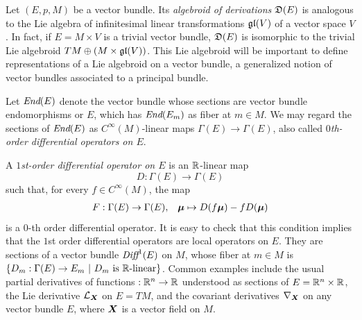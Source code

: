 


Let $(E, p, M)$ be a vector bundle. Its \emph{algebroid of derivations} $\mathfrak{D}(E)$ is analogous to the Lie algebra of infinitesimal linear transformations $\mathfrak{gl}(V)$ of a vector space $V$. In fact, if $E = M \times V$ is a trivial vector bundle, $\mathfrak{D}(E)$ is isomorphic to the trivial Lie algebroid $TM \oplus (M \times \mathfrak{gl}(V))$. This Lie algebroid will be important to define representations of a Lie algebroid on a vector bundle, a generalized notion of vector bundles associated to a principal bundle.

Let $\operatorname{\textit{End}}(E)$ denote the vector bundle whose sections are vector bundle endomorphisms or $E$, which has $\operatorname{\textit{End}}(E_m)$ as fiber at $m \in M$. We may regard the sections of $\operatorname{\textit{End}}(E)$ as $C^\infty(M)$-linear maps $\Gamma(E) \to \Gamma(E)$, also called \emph{$0$th-order differential operators on $E$}.

A \emph{$1$st-order differential operator on $E$} is an $\mathbb{R}$-linear map 
\[
    D: \Gamma(E) \to \Gamma(E)
\]
such that, for every $f \in C^\infty(M)$, the map
\begin{align*}
    F: \Gamma(E) \to \Gamma(E), && \bm{\mu} \mapsto D(f \bm{\mu}) - f D(\bm{\mu})
\end{align*}
is a $0$-th order differential operator. It is easy to check that this condition implies that the $1$st order differential operators are local operators on $E$. They are sections of a vector bundle $\operatorname{\textit{Diff}}^1(E)$ on $M$, whose fiber at $m \in M$ is $\left\{ D_m: \Gamma(E) \to E_m \ |\  D_m \textrm{ is $\mathbb{R}$-linear} \right\}$. Common examples include the usual partial derivatives of functions $:\mathbb{R}^n \to \mathbb{R}$ understood as sections of $E = \mathbb{R}^n \times \mathbb{R}$, the Lie derivative $\mathcal L_{\bm{X}}$ on $E = TM$, and the covariant derivatives $\nabla_{\bm{X}}$ on any vector bundle $E$, where $\bm{X}$ is a vector field on $M$.

